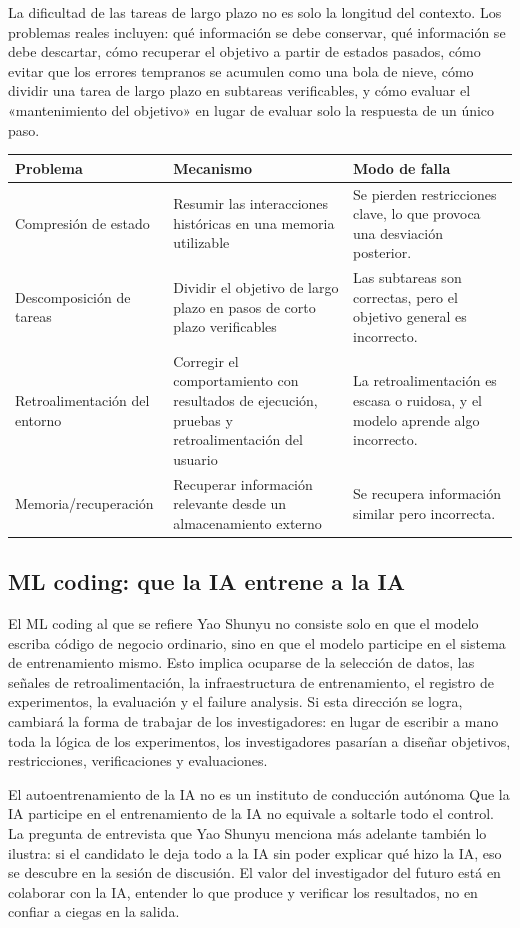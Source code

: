 La dificultad de las tareas de largo plazo no es solo la longitud del contexto. Los problemas reales incluyen: qué información se debe conservar, qué información se debe descartar, cómo recuperar el objetivo a partir de estados pasados, cómo evitar que los errores tempranos se acumulen como una bola de nieve, cómo dividir una tarea de largo plazo en subtareas verificables, y cómo evaluar el «mantenimiento del objetivo» en lugar de evaluar solo la respuesta de un único paso.

\noindent\begin{tabularx}{\textwidth}{p{}p{}X}
\toprule
Problema & Mecanismo & Modo de falla \\
\midrule
Compresión de estado & Resumir las interacciones históricas en una memoria utilizable & Se pierden restricciones clave, lo que provoca una desviación posterior. \\
Descomposición de tareas & Dividir el objetivo de largo plazo en pasos de corto plazo verificables & Las subtareas son correctas, pero el objetivo general es incorrecto. \\
Retroalimentación del entorno & Corregir el comportamiento con resultados de ejecución, pruebas y retroalimentación del usuario & La retroalimentación es escasa o ruidosa, y el modelo aprende algo incorrecto. \\
Memoria/recuperación & Recuperar información relevante desde un almacenamiento externo & Se recupera información similar pero incorrecta. \\
\bottomrule
\end{tabularx}

\subsection{ML coding: que la IA entrene a la IA}

El ML coding al que se refiere Yao Shunyu no consiste solo en que el modelo escriba código de negocio ordinario, sino en que el modelo participe en el sistema de entrenamiento mismo. Esto implica ocuparse de la selección de datos, las señales de retroalimentación, la infraestructura de entrenamiento, el registro de experimentos, la evaluación y el failure analysis. Si esta dirección se logra, cambiará la forma de trabajar de los investigadores: en lugar de escribir a mano toda la lógica de los experimentos, los investigadores pasarían a diseñar objetivos, restricciones, verificaciones y evaluaciones.

\begin{warningbox}{El autoentrenamiento de la IA no es un instituto de conducción autónoma}
Que la IA participe en el entrenamiento de la IA no equivale a soltarle todo el control. La pregunta de entrevista que Yao Shunyu menciona más adelante también lo ilustra: si el candidato le deja todo a la IA sin poder explicar qué hizo la IA, eso se descubre en la sesión de discusión. El valor del investigador del futuro está en colaborar con la IA, entender lo que produce y verificar los resultados, no en confiar a ciegas en la salida.
\end{warningbox}

